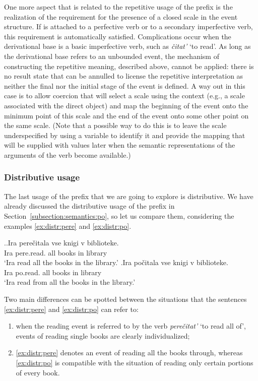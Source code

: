 One more aspect that is related to the repetitive usage of the prefix  is the realization of the requirement for the presence of a closed scale in the event structure. If  is attached to a perfective verb or to a secondary imperfective verb, this requirement is automatically satisfied. Complications occur when the derivational base is a basic imperfective verb, such as \textit{\v{c}itat'} `to read'. As long as the derivational base refers to an unbounded event, the mechanism of constructing the repetitive meaning, described above, cannot be applied: there is no result state that can be annulled to license the repetitive interpretation as neither the final nor the initial stage of the event is defined. A way out in this case is to allow coercion that will select a scale using the context (e.g., a scale associated with the direct object) and map the beginning of the event onto the minimum point of this scale and the end of the event onto some other point on the same scale. (Note that a possible way to do this is to leave the scale underspecified by using a variable to identify it and provide the mapping that will be supplied with values later when the semantic representations of the arguments of the verb become available.)

\subsubsection{Distributive usage}
The last usage of the prefix  that we are going to explore is distributive. We have already discussed the distributive usage of the prefix  in Section~\ref{subsection:semantics:po}, so let us compare them, considering the examples \ref{ex:distr:pere} and \ref{ex:distr:po}.

\ex.\ag.\label{ex:distr:pere}Ira pere\v{c}itala vse knigi v biblioteke.\\
Ira pere.read. all books in library\\
\trans `Ira read all the books in the library.'
\bg.\label{ex:distr:po}Ira po\v{c}itala vse knigi v biblioteke.\\
Ira po.read. all books in library\\
\trans `Ira read from all the books in the library.'

Two main differences can be spotted between the situations that the sentences \ref{ex:distr:pere} and \ref{ex:distr:po} can refer to:
\begin{enumerate}
\item when the reading event is referred to by the verb \textit{pere\v{c}itat'} `to read all of', events of reading single books are clearly individualized;
\item \ref{ex:distr:pere} denotes an event of reading all the books through, whereas \ref{ex:distr:po} is compatible with the situation of reading only certain portions of every book.
\end{enumerate}


